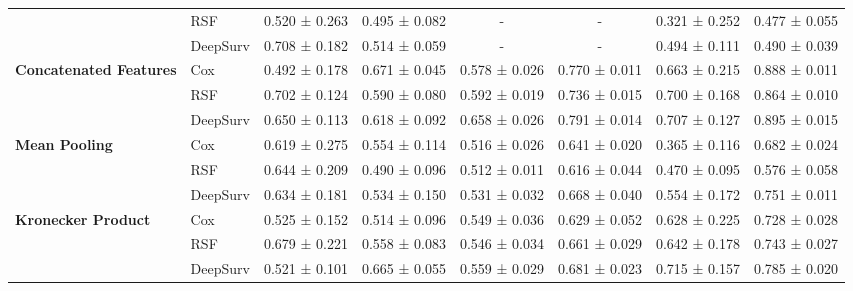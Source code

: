 \begin{sidewaystable}[htbp]
\begin{tabular}{@{}llcccccc@{}}
        & RSF & 0.520 ± 0.263 & 0.495 ± 0.082 & - & - & 0.321 ± 0.252 & 0.477 ± 0.055 \\
        & DeepSurv & 0.708 ± 0.182 & 0.514 ± 0.059 & - & - & 0.494 ± 0.111 & 0.490 ± 0.039 \\
        \midrule
        \multirow{3}{*}{\textbf{Concatenated Features}} & Cox & 0.492 ± 0.178 & 0.671 ± 0.045 & 0.578 ± 0.026 & 0.770 ± 0.011 & 0.663 ± 0.215 & 0.888 ± 0.011 \\
        & RSF & 0.702 ± 0.124 & 0.590 ± 0.080 & 0.592 ± 0.019 & 0.736 ± 0.015 & 0.700 ± 0.168 & 0.864 ± 0.010 \\
        & DeepSurv & 0.650 ± 0.113 & 0.618 ± 0.092 & 0.658 ± 0.026 & 0.791 ± 0.014 & 0.707 ± 0.127 & 0.895 ± 0.015 \\
        \midrule
        \multirow{3}{*}{\textbf{Mean Pooling}} & Cox & 0.619 ± 0.275 & 0.554 ± 0.114 & 0.516 ± 0.026 & 0.641 ± 0.020 & 0.365 ± 0.116 & 0.682 ± 0.024 \\
        & RSF & 0.644 ± 0.209 & 0.490 ± 0.096 & 0.512 ± 0.011 & 0.616 ± 0.044 & 0.470 ± 0.095 & 0.576 ± 0.058 \\
        & DeepSurv & 0.634 ± 0.181 & 0.534 ± 0.150 & 0.531 ± 0.032 & 0.668 ± 0.040 & 0.554 ± 0.172 & 0.751 ± 0.011 \\
        \midrule
        \multirow{3}{*}{\textbf{Kronecker Product}} & Cox & 0.525 ± 0.152 & 0.514 ± 0.096 & 0.549 ± 0.036 & 0.629 ± 0.052 & 0.628 ± 0.225 & 0.728 ± 0.028 \\
        & RSF & 0.679 ± 0.221 & 0.558 ± 0.083 & 0.546 ± 0.034 & 0.661 ± 0.029 & 0.642 ± 0.178 & 0.743 ± 0.027 \\
        & DeepSurv & 0.521 ± 0.101 & 0.665 ± 0.055 & 0.559 ± 0.029 & 0.681 ± 0.023 & 0.715 ± 0.157 & 0.785 ± 0.020 \\
        \bottomrule
    \end{tabular}
\end{sidewaystable}


